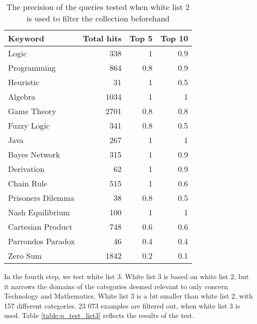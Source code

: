 \begin{table}[H]
\centering
\begin{tabular} {|| p{15em} | r | r | r ||} 
 \hline
 Keyword & Total hits & Top 5 & Top 10 \\ [0.5ex] 
 \hline

Logic & 338 & 1 & 0.9 \\
Programming & 864 & 0.8 & 0.9 \\
Heuristic & 31 & 1 & 0.5 \\
Algebra & 1034 & 1 & 1 \\
Game Theory & 2701 & 0.8 & 0.8 \\
\hline
Fuzzy Logic & 341 & 0.8 & 0.5 \\
Java & 267 & 1 & 1 \\
Bayes Network & 315 & 1 & 0.9 \\
Derivation & 62 & 1 & 0.9 \\
\hline
Chain Rule & 515 & 1 & 0.6 \\
Prisoners Dilemma & 38 & 0.8 & 0.5 \\
Nash Equilibrium & 100 & 1 & 1 \\
Cartesian Product & 748 & 0.6 & 0.6 \\
Parrondos Paradox & 46 & 0.4 & 0.4 \\
Zero Sum & 1842 & 0.2 & 0.1 \\

 \hline
\end{tabular}
\caption{The precision of the queries tested when white list 2 is used to filter the collection beforehand}
\label{table:p_test_list2}
\end{table}

In the fourth step, we test white list 3. White list 3 is based on white list 2, but it narrows the domains of the categories deemed relevant to only concern Technology and Mathematics. White list 3 is a bit smaller than white list 2, with 157 different categories. 23 073 examples are filtered out, when white list 3 is used. Table \ref{table:p_test_list3} reflects the results of the test.

